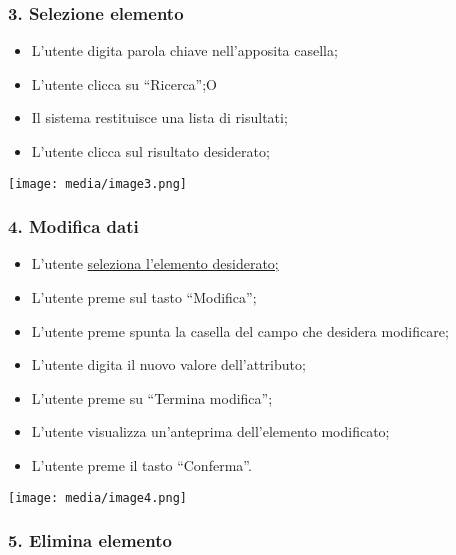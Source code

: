 \documentclass[a4paper,12pt]{report}
\begin{document}
\subsubsection{3. Selezione elemento}\label{selezione-elemento}

\begin{itemize}
  \item
    L'utente digita parola chiave nell'apposita casella;
  \item
    L'utente clicca su ``Ricerca'';O
  \item
    Il sistema restituisce una lista di risultati;
  \item
    L'utente clicca sul risultato desiderato;
\end{itemize}

\texttt{[image: media/image3.png]}

\subsubsection{}\label{section-4}

\subsubsection{4. Modifica dati}\label{modifica-dati}

\begin{itemize}
  \item
    L'utente \ul{seleziona l'elemento desiderato;}
  \item
    L'utente preme sul tasto ``Modifica'';
  \item
    L'utente preme spunta la casella del campo che desidera modificare;
  \item
    L'utente digita il nuovo valore dell'attributo;
  \item
    L'utente preme su ``Termina modifica'';
  \item
    L'utente visualizza un'anteprima dell'elemento modificato;
  \item
    L'utente preme il tasto ``Conferma''.
\end{itemize}

\texttt{[image: media/image4.png]}

\subsubsection{}\label{section-5}

\subsubsection{5. Elimina elemento}\label{elimina-elemento}
\end{document}
